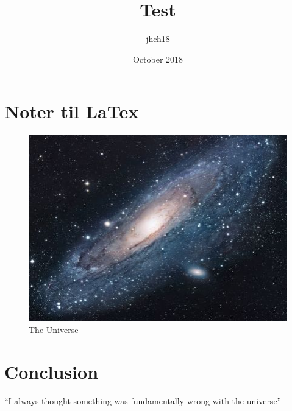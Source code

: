 \documentclass{article}
\title{Test}
\author{jhch18 }
\date{October 2018}
\begin{document}
\maketitle

\section{Noter til LaTex}


\begin{figure}[h!]
\centering
\includegraphics[scale=1.7]{universe}
\caption{The Universe}
\label{fig:universe}
\end{figure}

\section{Conclusion}
``I always thought something was fundamentally wrong with the universe'' \citep{adams1995hitchhiker}



\end{document}
